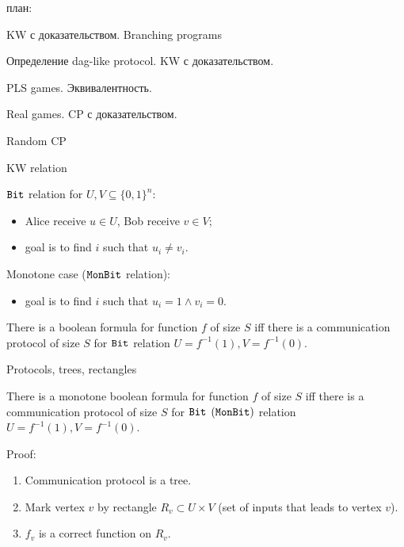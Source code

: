 план:

KW с доказательством.
Branching programs

Определение dag-like protocol.
KW с доказательством.

PLS games.
Эквивалентность.

Real games.
CP с доказательством.

Random CP


\begin{frame}{KW relation}
    \begin{definition}
        $\mathtt{Bit}$ relation for $U, V \subseteq \{0, 1\}^{n}$:
        \begin{itemize}
            \item Alice receive $u \in U$, Bob receive $v \in V$;
            \item goal is to find $i$ such that $u_i \neq v_i$.
        \end{itemize}
    	\pause    
        Monotone case ($\mathtt{MonBit}$ relation):
        \begin{itemize}
            \item goal is to find $i$ such that $u_i = 1 \land v_i = 0$.
        \end{itemize}
    \end{definition}

    \pause

    \begin{theorem}
        There is a  boolean formula for function $f$ of size $S$ iff there is a communication
        protocol of size $S$ for $\mathtt{Bit}$  relation $U = f^{-1}(1), V = f^{-1}(0)$.
    \end{theorem}
\end{frame}


\begin{frame}{Protocols, trees, rectangles}

    \begin{theorem}[KW 1990, $\Leftarrow$] 
        There is a monotone boolean formula for function $f$ of size $S$ iff there is a communication protocol of size $S$
        for $\mathtt{Bit}$ $(\mathtt{MonBit})$ relation $U = f^{-1}(1), V = f^{-1}(0)$.
    \end{theorem}

    \pause
    Proof:

    
    \begin{enumerate}
        \item Communication protocol is a tree.
        \item Mark vertex $v$ by rectangle $R_v \subset U \times V$ (set of inputs that leads to vertex $v$).
        \item $f_v$ is a correct function on $R_v$.
    \end{enumerate}
\end{frame}


